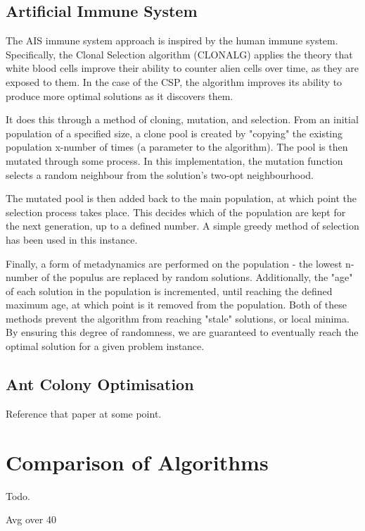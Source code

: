 \documentclass{article}
\begin{document}
  \subsection{Artificial Immune System}

    The AIS immune system approach is inspired by the human immune system. Specifically, the Clonal Selection algorithm (CLONALG) applies the theory that white blood cells improve their ability to counter alien cells over time, as they are exposed to them. In the case of the CSP, the algorithm improves its ability to produce more optimal solutions as it discovers them.

    It does this through a method of cloning, mutation, and selection. From an initial population of a specified size, a clone pool is created by "copying" the existing population x-number of times (a parameter to the algorithm). The pool is then mutated through some process. In this implementation, the mutation function selects a random neighbour from the solution's two-opt neighbourhood.

    The mutated pool is then added back to the main population, at which point the selection process takes place. This decides which of the population are kept for the next generation, up to a defined number. A simple greedy method of selection has been used in this instance.

    Finally, a form of metadynamics are performed on the population - the lowest n-number of the populus are replaced by random solutions. Additionally, the "age" of each solution in the population is incremented, until reaching the defined maximum age, at which point is it removed from the population. Both of these methods prevent the algorithm from reaching "stale" solutions, or local minima. By ensuring this degree of randomness, we are guaranteed to eventually reach the optimal solution for a given problem instance.

  \subsection{Ant Colony Optimisation}

    Reference that paper\cite{acoforcsp} at some point.

\section{Comparison of Algorithms}

  Todo.

  Avg over 40
\end{document}
